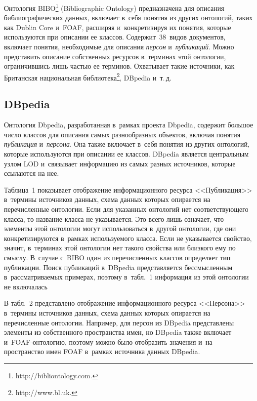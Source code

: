 \begin{multicols}{2}
     Онтология BIBO\footnote[1]{ {\sf http://bibliontology.com.}} 
     (Bibliographic Ontology)
     предназначена для 
описания библиографических данных, включает в~себя понятия из других 
онтологий, таких как Dublin Core и~FOAF, расширяя и~конкретизируя их 
понятия, которые используются при описании ее классов. 
Содержит~38~видов документов, вклю\-ча\-ет понятия, необходимые для 
описания \textit{персон} и~\textit{пуб\-ли\-ка\-ций}. Можно представить 
описание собственных ресурсов в~терминах этой онтологии, ограничившись 
лишь частью ее терминов. Охватывает такие источники, как Британская 
национальная библиотека\footnote{{\sf http://www.bl.uk.}}, DBpedia и~т.\,д.

    
     \subsection*{DBpedia}
     
     
    Онтология Dbpedia, разработанная в~рамках проекта Dbpedia, содержит 
большое число классов для описания самых разнообразных объектов, 
включая понятия \textit{пуб\-ли\-ка\-ция} и~\textit{персона}. Она также 
включает в~себя понятия из других онтологий, которые используются при 
описании ее классов. DBpedia является центральным узлом LOD и~связывает 
информацию из самых разных источников, которые ссылаются на нее. 


    
    Таблица~1 показывает отображение информационного ресурса 
<<Публикация>> в~термины источников данных, схема данных которых 
опирается на
 перечисленные онтологии. Если для указанных онтологий нет 
соответствующего класса, то название класса не указывается. Это всего лишь 
означает, что элементы этой онтологии могут использоваться в~другой 
онтологии, где они конкретизируются в~рамках используемого класса. Если 
не указывается свойство, значит, в~терминах этой онтологии нет такого 
свойства или близкого ему по смыслу. В~случае с~BIBO один из 
перечисленных классов определяет тип публикации. Поиск публикаций 
в~DBpedia представляется бессмысленным в~рассматриваемых примерах, 
поэтому в~табл.~1 информация из этой онтологии не включалась


    В табл.~2 представлено отображение информационного ресурса 
<<Персона>> в~термины источников данных, схема данных которых 
опирается на перечисленные онтологии. Например, для персон из DBpedia 
представлены элементы из собственного пространства имен, но DBpedia 
также включает и~FOAF-он\-то\-ло\-гию, поэтому можно было отобразить 
значения и~на пространство имен FOAF в~рамках источника данных DBpedia.



\end{multicols}
